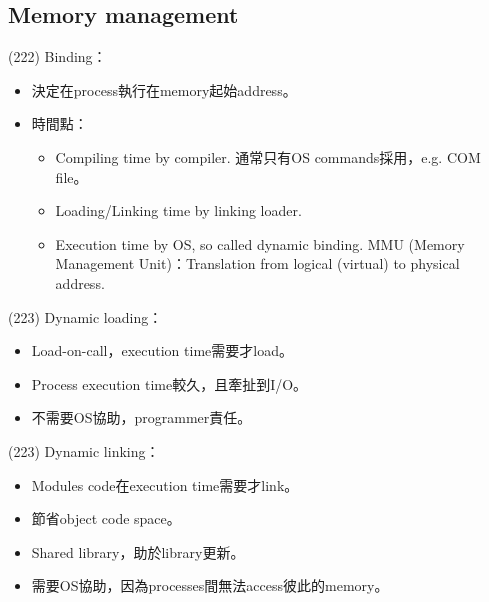 \subsection{Memory management}

\begin{theorem}{(222)} Binding：\begin{itemize}
        \item 決定在process執行在memory起始address。
        \item 時間點：\begin{itemize}
            \item Compiling time by compiler. 通常只有OS commands採用，e.g. COM file。
            \item Loading/Linking time by linking loader.
            \item Execution time by OS, so called dynamic binding. MMU (Memory Management Unit)：Translation from logical (virtual) to physical address.
        \end{itemize}
    \end{itemize}
\end{theorem}

\begin{theorem}{(223)} Dynamic loading：\begin{itemize}
        \item Load-on-call，execution time需要才load。
        \item Process execution time較久，且牽扯到I/O。
        \item 不需要OS協助，programmer責任。
    \end{itemize}
\end{theorem}

\begin{theorem}{(223)} Dynamic linking：\begin{itemize}
        \item Modules code在execution time需要才link。
        \item 節省object code space。
        \item Shared library，助於library更新。
        \item 需要OS協助，因為processes間無法access彼此的memory。
    \end{itemize}
\end{theorem}


